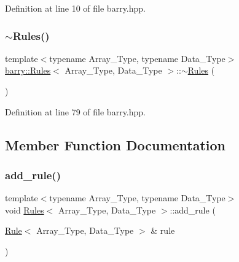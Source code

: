 Definition at line 10 of file barry.\+hpp.

\mbox{\label{classbarry_1_1_rules_a287ba2cf76f83ad982c05383b5726946}} 
\subsubsection{\texorpdfstring{$\sim$\+Rules()}{~Rules()}}
{\footnotesize\ttfamily template$<$typename Array\+\_\+\+Type, typename Data\+\_\+\+Type$>$ \\
\hyperlink{classbarry_1_1_rules}{barry\+::\+Rules}$<$ Array\+\_\+\+Type, Data\+\_\+\+Type $>$\+::$\sim$\hyperlink{classbarry_1_1_rules}{Rules} (\begin{DoxyParamCaption}{ }\end{DoxyParamCaption})\hspace{0.3cm}{\ttfamily [inline]}}



Definition at line 79 of file barry.\+hpp.



\subsection{Member Function Documentation}
\mbox{\label{classbarry_1_1_rules_a60583152fddcb11178dcf3d02a924d7c}} 
\subsubsection{\texorpdfstring{add\+\_\+rule()}{add\_rule()}\hspace{0.1cm}{\footnotesize\ttfamily [1/3]}}
{\footnotesize\ttfamily template$<$typename Array\+\_\+\+Type, typename Data\+\_\+\+Type$>$ \\
void \hyperlink{classbarry_1_1_rules}{Rules}$<$ Array\+\_\+\+Type, Data\+\_\+\+Type $>$\+::add\+\_\+rule (\begin{DoxyParamCaption}\item[{\hyperlink{classbarry_1_1_rule}{Rule}$<$ Array\+\_\+\+Type, Data\+\_\+\+Type $>$ \&}]{rule }\end{DoxyParamCaption})\hspace{0.3cm}{\ttfamily [inline]}}



